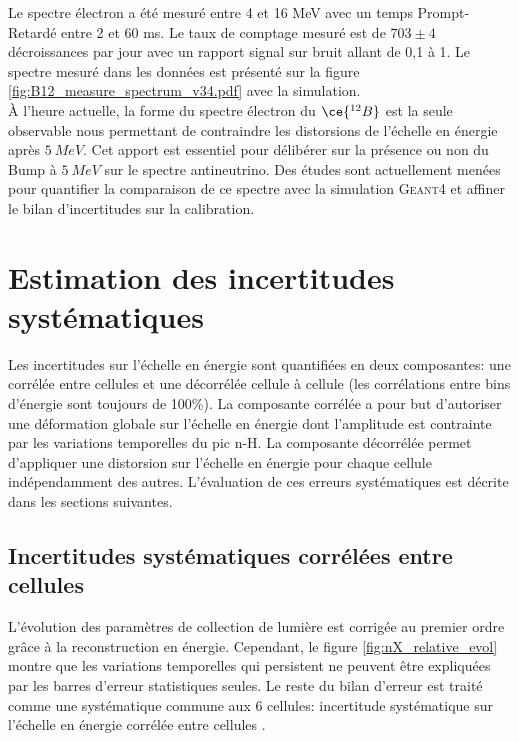 Le spectre électron a été mesuré entre 4 et 16 MeV avec un temps Prompt-Retardé entre 2 et 60 ms. Le taux de comptage mesuré est de $703 \pm 4$ décroissances par jour avec un rapport signal sur bruit allant de 0,1 à 1. Le spectre mesuré dans les données est présenté sur la figure \ref{fig:B12_measure_spectrum_v34.pdf} avec la simulation.\\

À l'heure actuelle, la forme du spectre électron du $\ce{^{12}B}$ est la seule observable nous permettant de contraindre les distorsions de l'échelle en énergie après $\SI{5}{MeV}$. Cet apport est essentiel pour délibérer sur la présence ou non du \og Bump \fg{} à $\SI{5}{MeV}$ sur le spectre antineutrino. Des études sont actuellement menées pour quantifier la comparaison de ce spectre avec la simulation \textsc{Geant4} et affiner le bilan d'incertitudes sur la calibration.\\

\bigbreak

\section{Estimation des incertitudes systématiques}
\label{sec:estimation_escale_errors}

Les incertitudes sur l'échelle en énergie sont quantifiées en deux composantes: une corrélée entre cellules et une décorrélée cellule à cellule (les corrélations entre bins d'énergie sont toujours de 100\%). La composante corrélée a pour but d'autoriser une déformation globale sur l'échelle en énergie dont l'amplitude est contrainte par les variations temporelles du pic n-H. La composante décorrélée permet d'appliquer une distorsion sur l'échelle en énergie pour chaque cellule indépendamment des autres. L'évaluation de ces erreurs systématiques est décrite dans les sections suivantes.\\


\subsection{Incertitudes systématiques corrélées entre cellules}

L'évolution des paramètres de collection de lumière est corrigée au premier ordre grâce à la reconstruction en énergie. Cependant, le figure \ref{fig:nX_relative_evol} montre que les variations temporelles qui persistent ne peuvent être expliquées par les barres d'erreur statistiques seules. Le reste du bilan d'erreur est traité comme une systématique commune aux 6 cellules: \og incertitude systématique sur l'échelle en énergie corrélée entre cellules \fg{}.\\

